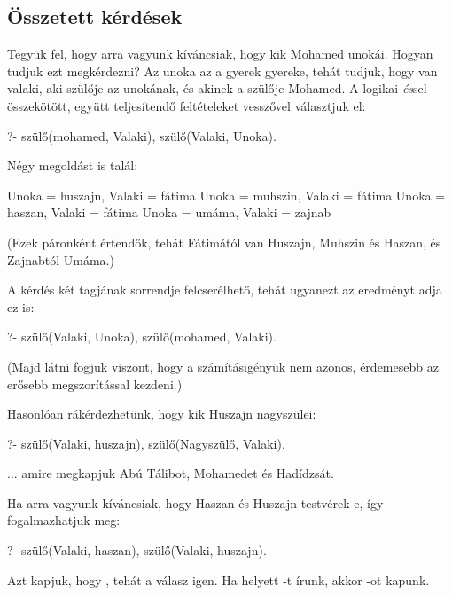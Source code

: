 \subsection*{Összetett kérdések}

Tegyük fel, hogy arra vagyunk kíváncsiak, hogy kik
Mohamed unokái. Hogyan tudjuk ezt megkérdezni? Az
unoka az a gyerek gyereke, tehát tudjuk, hogy van
valaki, aki szülője az unokának, és akinek a
szülője Mohamed. A logikai \emph{és}\/sel
összekötött, együtt teljesítendő feltételeket
vesszővel választjuk el:
\begin{prolog}
?- szülő(mohamed, Valaki), szülő(Valaki, Unoka).
\end{prolog}
Négy megoldást is talál:
\begin{prolog}
Unoka = huszajn,
Valaki = fátima
Unoka = muhszin,
Valaki = fátima
Unoka = haszan,
Valaki = fátima
Unoka = umáma,
Valaki = zajnab
\end{prolog}
(Ezek páronként értendők, tehát Fátimától van Huszajn, Muhszin és Haszan, és Zajnabtól Umáma.)

A kérdés két tagjának sorrendje felcserélhető, tehát ugyanezt az eredményt adja ez is:
\begin{prolog}
?- szülő(Valaki, Unoka), szülő(mohamed, Valaki).
\end{prolog}
(Majd látni fogjuk viszont, hogy a számításigényük nem azonos, érdemesebb az erősebb megszorítással kezdeni.)

Hasonlóan rákérdezhetünk, hogy kik Huszajn nagyszülei:
\begin{prolog}
?- szülő(Valaki, huszajn), szülő(Nagyszülő, Valaki).
\end{prolog}
... amire megkapjuk Abú Tálibot, Mohamedet és Hadídzsát.

Ha arra vagyunk kíváncsiak, hogy Haszan és Huszajn testvérek-e, így fogalmazhatjuk meg:
\begin{prolog}
?- szülő(Valaki, haszan), szülő(Valaki, huszajn).
\end{prolog}
Azt kapjuk, hogy , tehát a válasz igen. Ha  helyett -t írunk, akkor -ot kapunk.

